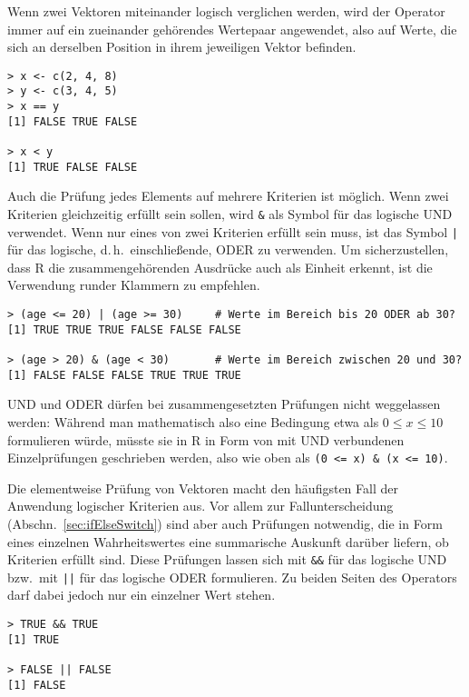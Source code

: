 Wenn zwei Vektoren miteinander logisch verglichen werden, wird der Operator immer auf ein zueinander gehörendes Wertepaar angewendet, also auf Werte, die sich an derselben Position in ihrem jeweiligen Vektor befinden.
\begin{lstlisting}
> x <- c(2, 4, 8)
> y <- c(3, 4, 5)
> x == y
[1] FALSE TRUE FALSE

> x < y
[1] TRUE FALSE FALSE
\end{lstlisting}

Auch die Prüfung jedes Elements auf mehrere Kriterien ist möglich. Wenn zwei Kriterien gleichzeitig erfüllt sein sollen, wird \lstinline!&! als Symbol für das logische UND verwendet. Wenn nur eines von zwei Kriterien erfüllt sein muss, ist das\index[func]{\textbar@\texttt{\textbar, \textbar\textbar}} Symbol \lstinline!|! für das logische, d.\,h.\ einschließende, ODER zu verwenden. Um sicherzustellen, dass R die zusammengehörenden Ausdrücke auch als Einheit erkennt, ist die Verwendung runder Klammern zu empfehlen.
\begin{lstlisting}
> (age <= 20) | (age >= 30)     # Werte im Bereich bis 20 ODER ab 30?
[1] TRUE TRUE TRUE FALSE FALSE FALSE

> (age > 20) & (age < 30)       # Werte im Bereich zwischen 20 und 30?
[1] FALSE FALSE FALSE TRUE TRUE TRUE
\end{lstlisting}

UND und ODER dürfen bei zusammengesetzten Prüfungen nicht weggelassen werden: Während man mathematisch also eine Bedingung etwa als $0 \leq x \leq 10$ formulieren würde, müsste sie in R in Form von mit UND verbundenen Einzelprüfungen geschrieben werden, also wie oben als \lstinline!(0 <= x) & (x <= 10)!.

Die elementweise Prüfung von Vektoren macht den häufigsten Fall der Anwendung logischer Kriterien aus. Vor allem zur Fallunterscheidung (Abschn.\ \ref{sec:ifElseSwitch}) sind aber auch Prüfungen notwendig, die in Form eines einzelnen Wahrheitswertes eine summarische Auskunft darüber liefern, ob Kriterien erfüllt sind. Diese Prüfungen lassen sich mit \lstinline!&&! für das logische UND bzw.\ mit\index[func]{\textbar@\texttt{\textbar, \textbar\textbar}} \lstinline!||! für das logische ODER formulieren. Zu beiden Seiten des Operators darf dabei jedoch nur ein einzelner Wert stehen.
\begin{lstlisting}
> TRUE && TRUE
[1] TRUE

> FALSE || FALSE
[1] FALSE
\end{lstlisting}

